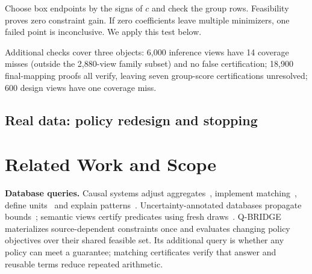 \documentclass[conference]{IEEEtran}
\begin{document}
Choose box endpoints by the signs of $c$ and check the group rows. Feasibility proves zero constraint gain. If zero coefficients leave multiple minimizers, one failed point is inconclusive. We apply this test below.






Additional checks cover three objects: 6,000 inference views have 14 coverage misses (outside the 2,880-view family subset) and no false certification; 18,900 final-mapping proofs all verify, leaving seven group-score certifications unresolved; 600 design views have one coverage miss.



\subsection{Real data: policy redesign and stopping}\label{sec:coat}


\begin{table}[t]
\centering
\caption{Coat: one policy versus the full policy family.}
\label{tab:coat-blocks}
\end{table}







\label{sec:catalogue-workflow}



\section{Related Work and Scope}\label{sec:related}
\textbf{Database queries.} Causal systems adjust aggregates~\cite{salimi2018hypdb}, implement matching~\cite{salimi2017zaliql}, define units~\cite{salimi2020carl} and explain patterns~\cite{youngmann2024causumx}. Uncertainty-annotated databases propagate bounds~\cite{Feng2019UADB}; semantic views certify predicates using fresh draws~\cite{Hassanzadeh2026SemanticViews}. Q-BRIDGE materializes source-dependent constraints once and evaluates changing policy objectives over their shared feasible set. Its additional query is whether any policy can meet a guarantee; matching certificates verify that answer and reusable terms reduce repeated arithmetic.
\end{document}
